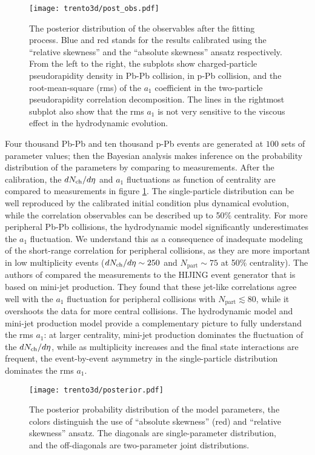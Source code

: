 \begin{figure}
\singlespacing 
\texttt{[image: trento3d/post\_obs.pdf]}
\caption[The posterior distribution of the observables after the fitting]{The posterior distribution of the observables after the fitting process. Blue and red stands for the results calibrated using the ``relative skewness'' and the ``absolute skewness'' ansatz respectively.
From the left to the right, the subplots show charged-particle pseudorapidity density in Pb-Pb collision, in p-Pb collision, and the root-mean-square (rms) of the $a_1$ coefficient in the two-particle pseudorapidity correlation decomposition. The lines in the rightmost subplot also show that the rms $a_1$ is not very sensitive to the viscous effect in the hydrodynamic evolution.}
\label{fig:trento:post_obs}
\end{figure}

Four thousand Pb-Pb and ten thousand p-Pb events are generated at $100$ sets of parameter values; then the Bayesian analysis makes inference on the probability distribution of the parameters by comparing to measurements.
After the calibration, the $dN_\text{ch}/d\eta$ and $a_1$ fluctuations as function of centrality are compared to measurements in figure \ref{fig:trento:post_obs}.
The single-particle distribution can be well reproduced by the calibrated initial condition plus dynamical evolution, while the correlation observables can be described up to 50\% centrality. 
For more peripheral Pb-Pb collisions, the hydrodynamic model significantly underestimates the $a_1$ fluctuation.
We understand this as a consequence of inadequate modeling of the short-range correlation for peripheral collisions, as they are more important in low multiplicity events ($dN_\text{ch}/d\eta\sim 250$ and $N_{\textrm{part}} \sim 75$ at 50\% centrality).
The authors of \cite{ATLAS:2015kla} compared the measurements to the HIJING event generator that is based on mini-jet production.
They found that these jet-like correlations agree well with the $a_1$ fluctuation for peripheral collisions with $N_{\textrm{part}} \lesssim 80$, while it overshoots the data for more central collisions.
The hydrodynamic model and mini-jet production model provide a complementary picture to fully understand the rms $a_1$: at larger centrality, mini-jet production dominates the fluctuation of the $dN_\text{ch}/d\eta$, while as multiplicity increases and the final state interactions are frequent, the event-by-event asymmetry in the single-particle distribution dominates the rms $a_1$.

\begin{figure}
\singlespacing 
\centering
\texttt{[image: trento3d/posterior.pdf]}
\caption[The posterior probability distribution of the model parameters,]{The posterior probability distribution of the model parameters, the colors distinguish the use of ``absolute skewness'' (red) and ``relative skewness'' ansatz. The diagonals are single-parameter distribution, and the off-diagonals are two-parameter joint distributions.}
\label{fig:trento:posterior}
\end{figure}

